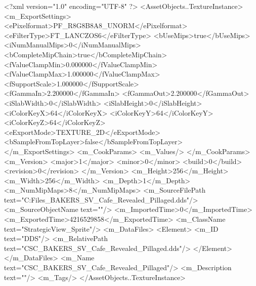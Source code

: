 <?xml version="1.0" encoding="UTF-8" ?>
<AssetObjects..TextureInstance>
	<m_ExportSettings>
		<ePixelformat>PF_R8G8B8A8_UNORM</ePixelformat>
		<eFilterType>FT_LANCZOS6</eFilterType>
		<bUseMips>true</bUseMips>
		<iNumManualMips>0</iNumManualMips>
		<bCompleteMipChain>true</bCompleteMipChain>
		<fValueClampMin>0.000000</fValueClampMin>
		<fValueClampMax>1.000000</fValueClampMax>
		<fSupportScale>1.000000</fSupportScale>
		<fGammaIn>2.200000</fGammaIn>
		<fGammaOut>2.200000</fGammaOut>
		<iSlabWidth>0</iSlabWidth>
		<iSlabHeight>0</iSlabHeight>
		<iColorKeyX>64</iColorKeyX>
		<iColorKeyY>64</iColorKeyY>
		<iColorKeyZ>64</iColorKeyZ>
		<eExportMode>TEXTURE_2D</eExportMode>
		<bSampleFromTopLayer>false</bSampleFromTopLayer>
	</m_ExportSettings>
	<m_CookParams>
		<m_Values/>
	</m_CookParams>
	<m_Version>
		<major>1</major>
		<minor>0</minor>
		<build>0</build>
		<revision>0</revision>
	</m_Version>
	<m_Height>256</m_Height>
	<m_Width>256</m_Width>
	<m_Depth>1</m_Depth>
	<m_NumMipMaps>8</m_NumMipMaps>
	<m_SourceFilePath text="C:\Users\Shadow\Desktop\Working Files\Icons\StrategicView\CSC_BAKERS_SV_Cafe_Revealed_Pillaged.dds"/>
	<m_SourceObjectName text=""/>
	<m_ImportedTime>0</m_ImportedTime>
	<m_ExportedTime>4216529858</m_ExportedTime>
	<m_ClassName text="StrategicView_Sprite"/>
	<m_DataFiles>
		<Element>
			<m_ID text="DDS"/>
			<m_RelativePath text="CSC_BAKERS_SV_Cafe_Revealed_Pillaged.dds"/>
		</Element>
	</m_DataFiles>
	<m_Name text="CSC_BAKERS_SV_Cafe_Revealed_Pillaged"/>
	<m_Description text=""/>
	<m_Tags/>
</AssetObjects..TextureInstance>

